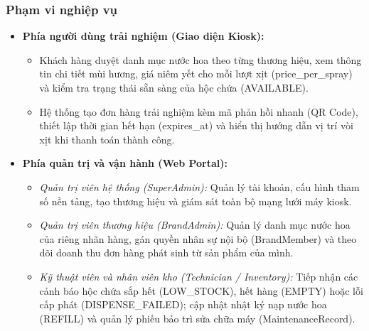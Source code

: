 {\subsubsection{Phạm vi nghiệp vụ}
\begin{itemize}[leftmargin=1.5cm]
    \item \textbf{Phía người dùng trải nghiệm (Giao diện Kiosk):}
    \begin{itemize}
        \item Khách hàng duyệt danh mục nước hoa theo từng thương hiệu, xem thông tin chi tiết mùi hương, giá niêm yết cho mỗi lượt xịt (price\_per\_spray) và kiểm tra trạng thái sẵn sàng của hộc chứa (AVAILABLE).
        \item Hệ thống tạo đơn hàng trải nghiệm kèm mã phản hồi nhanh (QR Code), thiết lập thời gian hết hạn (expires\_at) và hiển thị hướng dẫn vị trí vòi xịt khi thanh toán thành công.
    \end{itemize}
    \item \textbf{Phía quản trị và vận hành (Web Portal):}
    \begin{itemize}
        \item \textit{Quản trị viên hệ thống (SuperAdmin):} Quản lý tài khoản, cấu hình tham số nền tảng, tạo thương hiệu và giám sát toàn bộ mạng lưới máy kiosk.
        \item \textit{Quản trị viên thương hiệu (BrandAdmin):} Quản lý danh mục nước hoa của riêng nhãn hàng, gán quyền nhân sự nội bộ (BrandMember) và theo dõi doanh thu đơn hàng phát sinh từ sản phẩm của mình.
        \item \textit{Kỹ thuật viên và nhân viên kho (Technician / Inventory):} Tiếp nhận các cảnh báo hộc chứa sắp hết (LOW\_STOCK), hết hàng (EMPTY) hoặc lỗi cấp phát (DISPENSE\_FAILED); cập nhật nhật ký nạp nước hoa (REFILL) và quản lý phiếu bảo trì sửa chữa máy (MaintenanceRecord).
    \end{itemize}
\end{itemize}

}
